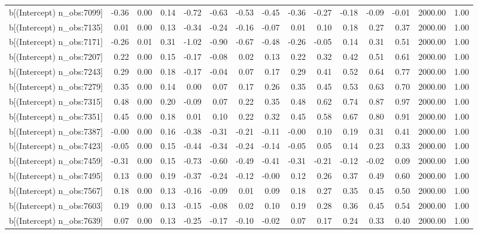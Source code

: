 \begin{table}[ht]
\begin{tabular}{rrrrrrrrrrrrrrr}
  b[(Intercept) n\_obs:7099] & -0.36 & 0.00 & 0.14 & -0.72 & -0.63 & -0.53 & -0.45 & -0.36 & -0.27 & -0.18 & -0.09 & -0.01 & 2000.00 & 1.00 \\ 
  b[(Intercept) n\_obs:7135] & 0.01 & 0.00 & 0.13 & -0.34 & -0.24 & -0.16 & -0.07 & 0.01 & 0.10 & 0.18 & 0.27 & 0.37 & 2000.00 & 1.00 \\ 
  b[(Intercept) n\_obs:7171] & -0.26 & 0.01 & 0.31 & -1.02 & -0.90 & -0.67 & -0.48 & -0.26 & -0.05 & 0.14 & 0.31 & 0.51 & 2000.00 & 1.00 \\ 
  b[(Intercept) n\_obs:7207] & 0.22 & 0.00 & 0.15 & -0.17 & -0.08 & 0.02 & 0.13 & 0.22 & 0.32 & 0.42 & 0.51 & 0.61 & 2000.00 & 1.00 \\ 
  b[(Intercept) n\_obs:7243] & 0.29 & 0.00 & 0.18 & -0.17 & -0.04 & 0.07 & 0.17 & 0.29 & 0.41 & 0.52 & 0.64 & 0.77 & 2000.00 & 1.00 \\ 
  b[(Intercept) n\_obs:7279] & 0.35 & 0.00 & 0.14 & 0.00 & 0.07 & 0.17 & 0.26 & 0.35 & 0.45 & 0.53 & 0.63 & 0.70 & 2000.00 & 1.00 \\ 
  b[(Intercept) n\_obs:7315] & 0.48 & 0.00 & 0.20 & -0.09 & 0.07 & 0.22 & 0.35 & 0.48 & 0.62 & 0.74 & 0.87 & 0.97 & 2000.00 & 1.00 \\ 
  b[(Intercept) n\_obs:7351] & 0.45 & 0.00 & 0.18 & 0.01 & 0.10 & 0.22 & 0.32 & 0.45 & 0.58 & 0.67 & 0.80 & 0.91 & 2000.00 & 1.00 \\ 
  b[(Intercept) n\_obs:7387] & -0.00 & 0.00 & 0.16 & -0.38 & -0.31 & -0.21 & -0.11 & -0.00 & 0.10 & 0.19 & 0.31 & 0.41 & 2000.00 & 1.00 \\ 
  b[(Intercept) n\_obs:7423] & -0.05 & 0.00 & 0.15 & -0.44 & -0.34 & -0.24 & -0.14 & -0.05 & 0.05 & 0.14 & 0.23 & 0.33 & 2000.00 & 1.00 \\ 
  b[(Intercept) n\_obs:7459] & -0.31 & 0.00 & 0.15 & -0.73 & -0.60 & -0.49 & -0.41 & -0.31 & -0.21 & -0.12 & -0.02 & 0.09 & 2000.00 & 1.00 \\ 
  b[(Intercept) n\_obs:7495] & 0.13 & 0.00 & 0.19 & -0.37 & -0.24 & -0.12 & -0.00 & 0.12 & 0.26 & 0.37 & 0.49 & 0.60 & 2000.00 & 1.00 \\ 
  b[(Intercept) n\_obs:7567] & 0.18 & 0.00 & 0.13 & -0.16 & -0.09 & 0.01 & 0.09 & 0.18 & 0.27 & 0.35 & 0.45 & 0.50 & 2000.00 & 1.00 \\ 
  b[(Intercept) n\_obs:7603] & 0.19 & 0.00 & 0.13 & -0.15 & -0.08 & 0.02 & 0.10 & 0.19 & 0.28 & 0.36 & 0.45 & 0.54 & 2000.00 & 1.00 \\ 
  b[(Intercept) n\_obs:7639] & 0.07 & 0.00 & 0.13 & -0.25 & -0.17 & -0.10 & -0.02 & 0.07 & 0.17 & 0.24 & 0.33 & 0.40 & 2000.00 & 1.00 \\ 

\end{tabular}
\end{table}
